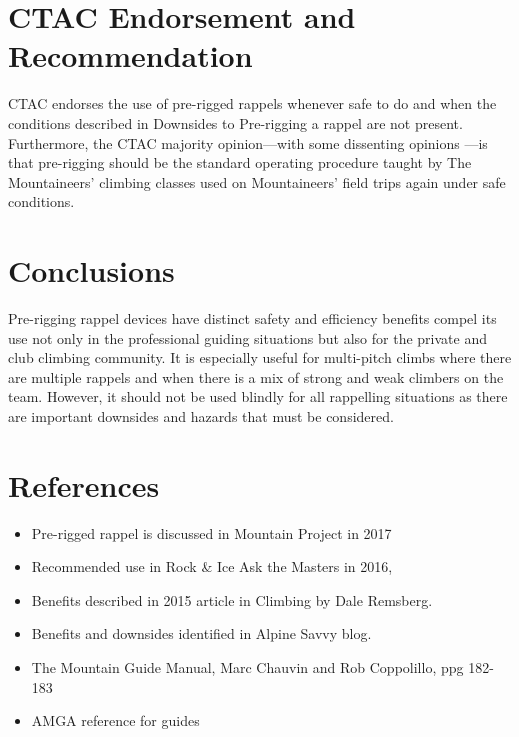 \documentclass[nonacm,acmtog]{acmart}
\begin{document}
\section{CTAC Endorsement and Recommendation}

  CTAC endorses the use of pre-rigged rappels whenever safe to do and when the
  conditions described in Downsides to Pre-rigging a rappel are not present.
  Furthermore, the CTAC majority opinion---with some dissenting opinions ---is
  that pre-rigging should be the standard operating procedure taught by The
  Mountaineers' climbing classes used on Mountaineers' field trips again under
  safe conditions.

\section{Conclusions}

  Pre-rigging rappel devices have distinct safety and efficiency benefits
  compel its use not only in the professional guiding situations but also for
  the private and club climbing community. It is especially useful for
  multi-pitch climbs where there are multiple rappels and when there is a mix
  of strong and weak climbers on the team.  However, it should not be used
  blindly for all rappelling situations as there are important downsides and
  hazards that must be considered.

\section{References}

   \begin{itemize}
   \item Pre-rigged rappel  is discussed in Mountain Project in 2017
   \item Recommended use in Rock \& Ice Ask the Masters in 2016,
   \item Benefits described in 2015 article in Climbing by Dale Remsberg.
   \item Benefits and downsides identified in Alpine Savvy blog.
   \item The Mountain Guide Manual, Marc Chauvin and Rob Coppolillo, ppg
     182-183
   \item AMGA reference for guides
   \end{itemize}



\end{document}
